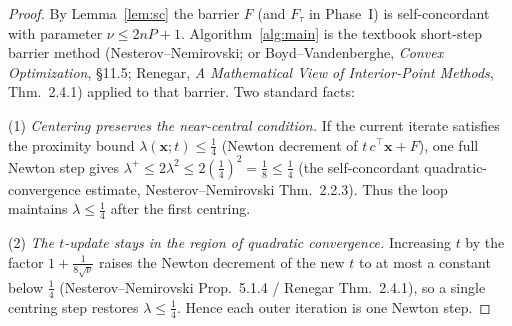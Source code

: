\documentclass{amsart}
\begin{document}
\begin{proof}
By Lemma~\ref{lem:sc} the barrier $F$ (and $F_\tau$ in Phase~I) is self-concordant
with parameter $\nu\le2nP+1$. Algorithm~\ref{alg:main} is the textbook short-step
barrier method (Nesterov--Nemirovski; or Boyd--Vandenberghe, \emph{Convex
Optimization}, \S11.5; Renegar, \emph{A Mathematical View of Interior-Point
Methods}, Thm.~2.4.1) applied to that barrier. Two standard facts:

(1) \emph{Centering preserves the near-central condition.} If the current iterate
satisfies the proximity bound $\lambda(\bm x;t)\le\frac14$ (Newton decrement of
$t\,c^{\!\top}\bm x+F$), one full Newton step gives $\lambda^+\le2\lambda^2\le
2(\tfrac14)^2=\tfrac18\le\frac14$ (the self-concordant quadratic-convergence
estimate, Nesterov--Nemirovski Thm.~2.2.3). Thus the loop maintains
$\lambda\le\frac14$ after the first centring.

(2) \emph{The $t$-update stays in the region of quadratic convergence.}
Increasing $t$ by the factor $1+\frac{1}{8\sqrt\nu}$ raises the Newton decrement of
the new $t$ to at most a constant below $\frac14$ (Nesterov--Nemirovski Prop.~5.1.4
/ Renegar Thm.~2.4.1), so a single centring step restores $\lambda\le\frac14$. Hence
each outer iteration is one Newton step.


\end{proof}
\end{document}
